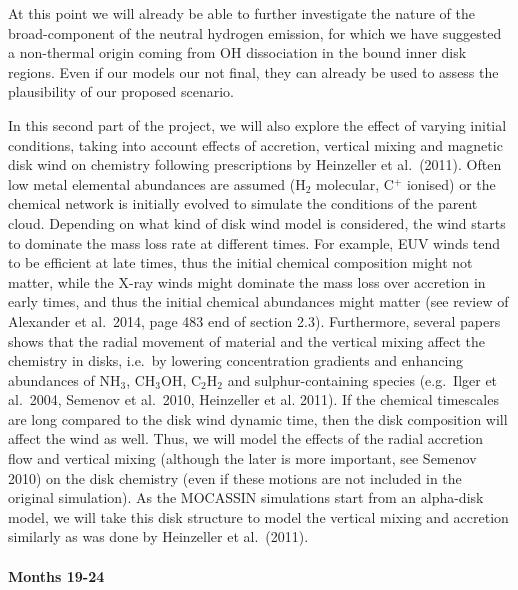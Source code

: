 \documentclass[10pt,fleqn,twoside]{article}
\begin{document}
At this point we will already be able to further investigate the nature of the broad-component of the neutral hydrogen emission, for which we have suggested a non-thermal origin coming from OH dissociation in the bound inner disk regions. Even if our models our not final, they can already be used to assess the plausibility of our proposed scenario.

In this second part of the project, we will also explore the effect of
varying initial conditions, taking into account effects of accretion,
vertical mixing and magnetic disk wind on chemistry following
prescriptions by Heinzeller et al.\ (2011). Often low metal elemental
abundances are assumed (H$_2$ molecular, C$^+$ ionised) or the
chemical network is initially evolved to simulate the conditions of
the parent cloud.  Depending on what kind of disk wind model is
considered, the wind starts to dominate the mass loss rate at
different times. For example, EUV winds tend to be efficient at late
times, thus the initial chemical composition might not matter, while
the X-ray winds might dominate the mass loss over accretion in early
times, and thus the initial chemical abundances might matter (see
review of Alexander et al.\ 2014, page 483 end of section
2.3). Furthermore, several papers shows that the radial movement of
material and the vertical mixing affect the chemistry in disks,
i.e.\ by lowering concentration gradients and enhancing abundances of
NH$_3$, CH$_3$OH, C$_2$H$_2$ and sulphur-containing species
(e.g.\ Ilger et al.\ 2004, Semenov et al.\ 2010, Heinzeller et
al. 2011). If the chemical timescales are long compared to the disk
wind dynamic time, then the disk composition will affect the wind as
well. Thus, we will model the effects of the radial accretion flow and
vertical mixing (although the later is more important, see Semenov
2010) on the disk chemistry (even if these motions are not included in
the original simulation). As the MOCASSIN simulations start from an
alpha-disk model, we will take this disk structure to model the
vertical mixing and accretion similarly as was done by Heinzeller et
al.\ (2011). 

\paragraph{ Months 19-24}
\end{document}
